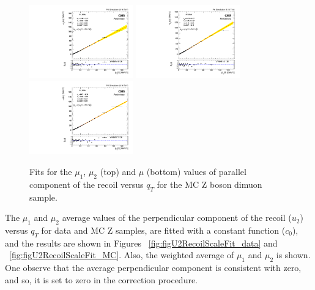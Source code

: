 \begin{figure}
\begin{center}
\includegraphics[width=0.4\textwidth]{Figures/WBoson/Analysis/Correction/Recoil/RecoilFitsqT/MC/fitPFu1mean1.pdf}
\includegraphics[width=0.4\textwidth]{Figures/WBoson/Analysis/Correction/Recoil/RecoilFitsqT/MC/fitPFu1mean2.pdf} \\
\includegraphics[width=0.4\textwidth]{Figures/WBoson/Analysis/Correction/Recoil/RecoilFitsqT/MC/fitPFu1mean.pdf}
\caption{Fits for the $\mu_{1}$,  $\mu_{2}$ (top) and $\mu$ (bottom) values of parallel component of the recoil versus $q_{T}$ for the MC Z boson dimuon sample.}
\label{fig:figU1RecoilScaleFit_MC}
\end{center}
\end{figure}

The $\mu_{1}$ and  $\mu_{2}$ average values of the perpendicular component of the recoil ($u_{2}$) versus $q_{T}$ for data and MC Z samples, are fitted with a constant function ($c_{0}$), and the results are shown in Figures ~\ref{fig:figU2RecoilScaleFit_data} and ~\ref{fig:figU2RecoilScaleFit_MC}. Also, the weighted average of $\mu_{1}$ and  $\mu_{2}$ is shown. One observe that the average perpendicular component is consistent with zero, and so, it is set to zero in the correction procedure.

